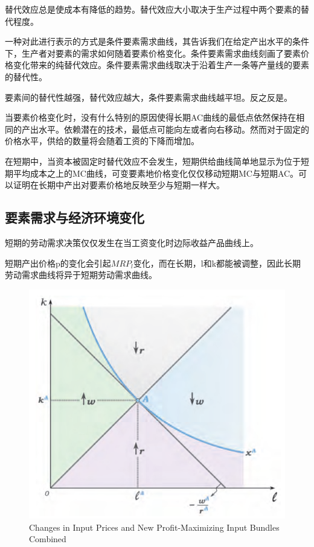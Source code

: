 \documentclass{article}
\begin{document}
替代效应总是使成本有降低的趋势。替代效应大小取决于生产过程中两个要素的替代程度。

一种对此进行表示的方式是条件要素需求曲线，其告诉我们在给定产出水平的条件下，生产者对要素的需求如何随着要素价格变化。条件要素需求曲线刻画了要素价格变化带来的纯替代效应。条件要素需求曲线取决于沿着生产一条等产量线的要素的替代性。

要素间的替代性越强，替代效应越大，条件要素需求曲线越平坦。反之反是。

当要素价格变化时，没有什么特别的原因使得长期AC曲线的最低点依然保持在相同的产出水平。依赖潜在的技术，最低点可能向左或者向右移动。然而对于固定的价格水平，供给的数量将会随着工资的下降而增加。

在短期中，当资本被固定时替代效应不会发生，短期供给曲线简单地显示为位于短期平均成本之上的MC曲线，可变要素地价格变化仅仅移动短期MC与短期AC。可以证明在长期中产出对要素价格地反映至少与短期一样大。

\subsection{要素需求与经济环境变化}

短期的劳动需求决策仅仅发生在当工资变化时边际收益产品曲线上。

短期产出价格p的变化会引起$ MRP_l $变化，而在长期，l和k都能被调整，因此长期劳动需求曲线将异于短期劳动需求曲线。

\begin{figure}[H] %
	\centering %
	\includegraphics[width=1\textwidth]{13_8} %
	\caption{Changes in Input Prices and New Profit-Maximizing Input Bundles
		Combined} %
	\label{Fig.main9} %
\end{figure}
\end{document}
